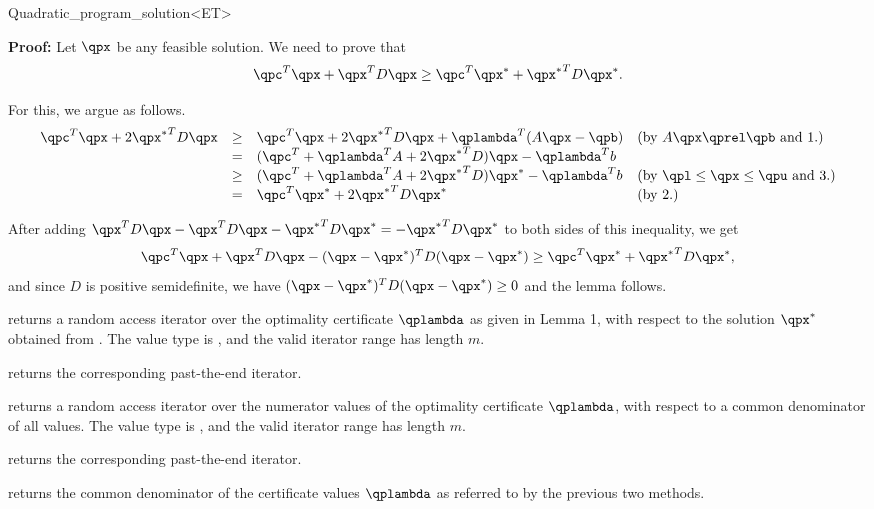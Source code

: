 \begin{ccRefClass}{Quadratic_program_solution<ET>}
\begin{ccAdvanced}
{\bf Proof:} Let $\qpx$ be any feasible solution. We need to prove that
\[\qpc^T\qpx + \qpx^TD\qpx \geq \qpc^T\qpx^* + {\qpx^*}^TD\qpx^*.\]

For this, we argue as follows.
\[
\begin{array}{lcll}
\qpc^T\qpx + 2{\qpx^*}^TD\qpx &\geq& \qpc^T\qpx + 2{\qpx^*}^TD\qpx + \qplambda^T(A\qpx-\qpb) &  
\mbox{(by $A\qpx\qprel \qpb$ and 1.)} \\
                  &=& (\qpc^T + \qplambda^T A + 2{\qpx^*}^TD)\qpx - \qplambda^Tb \\
                  &\geq& (\qpc^T + \qplambda^T A + 2{\qpx^*}^TD)\qpx^* - \qplambda^Tb &
\mbox{(by $\qpl\leq \qpx \leq \qpu$ and 3.)} \\
                  &=& \qpc^T\qpx^* + 2{\qpx^*}^TD\qpx^* &
\mbox{(by 2.)}
\end{array}
\]

After adding $\qpx^TD\qpx - \qpx^TD\qpx - {\qpx^*}^TD\qpx^* = -{\qpx^*}^TD\qpx^*$ to both sides of
this inequality, we get
\[
\qpc^T\qpx + \qpx^TD\qpx - (\qpx-\qpx^*)^TD(\qpx-\qpx^*) \geq \qpc^T\qpx^* + {\qpx^*}^TD\qpx^*,
\] 
and since $D$ is positive semidefinite, we have
$(\qpx-\qpx^*)^TD(\qpx-\qpx^*)\geq 0$ and the lemma follows.


{returns a random access iterator over the optimality certificate 
$\qplambda$ as given in Lemma 1, with respect to the solution $\qpx^*$ 
obtained from \ccVar{}. The value type
is , and the valid iterator range has length $m$.
\ccPrecond \ccVar{}}

{returns the corresponding past-the-end iterator.}

{returns a random access iterator over the numerator values
of the optimality certificate $\qplambda$, with respect to a 
common denominator of all values. The value type
is , and the valid iterator range has length $m$.}

{returns the corresponding past-the-end iterator.}

{returns the common denominator of the certificate values 
$\qplambda$ as referred to by the previous two methods.}


\end{ccAdvanced}
\end{ccRefClass}
